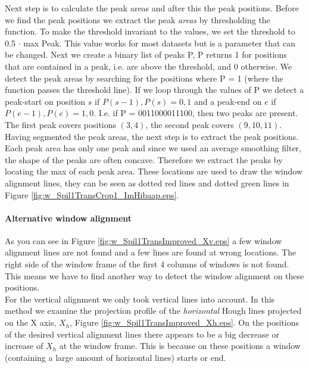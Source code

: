 Next step is to calculate the peak areas and after this the peak positions. 
Before we find the peak positions we extract the peak \emph{areas} by thresholding the
function. To make the threshold invariant to the values, we set the threshold to 0.5 $\cdot$ max Peak. 
This value works for most datasets but is a parameter that can be changed.
Next we create a binary list of peaks P, P returns 1 for positions that are contained in
a peak, i.e. are above the threshold, and 0 otherwise.
We detect the peak areas by searching for the positions where P = 1
(where the function passes the threshold line). 
If we loop through the values of P we detect a peak-start on position $s$ if ${P(s-1),P(s)}={0,1}$
and a peak-end on $e$ if ${P(e-1),P(e)}={1,0}$. 
I.e. if P = 0011000011100, then two peaks are present. The first peak covers positions $(3,4)$, 
the second peak covers $(9,10,11)$.\\

Having segmented the peak areas, the next step is to extract the peak positions. 
Each peak area has only one peak and since we used an average smoothing filter, the shape of 
the peaks are often concave. Therefore we extract the peaks by locating the max of each peak area. 
These locations are used to draw the window alignment lines, they can be seen
as dotted red lines and dotted green lines in Figure \ref{fig:w_Spil1TransCrop1_ImHibaap.eps}.

\paragraph{Alternative window alignment}
As you can see in Figure \ref{fig:w_Spil1TransImproved_Xv.eps}
a few window alignment lines are not found and a few lines are found at wrong locations.
The right side of the window frame of the first 4 columns of windows is not found.
This means we have to find another way to detect the window alignment on these positions.\\

For the vertical alignment we only took vertical lines into account.
In this method we examine the projection profile of the \emph{horizontal} Hough lines
projected on the X axis, $X_h$, Figure \ref{fig:w_Spil1TransImproved_Xh.eps}.
On the positions of the desired vertical alignment lines there appears to be a 
big decrease or increase of $X_h$ at the window frame. This is because on these
positions a window (containing a large amount of horizontal lines) starts or end.

